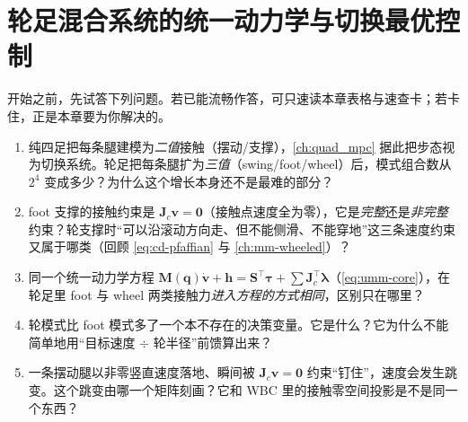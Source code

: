 \chapter{轮足混合系统的统一动力学与切换最优控制}\label{ch:wl-dynamics}


\begin{practice}[前置自测]
开始之前，先试答下列问题。若已能流畅作答，可只速读本章表格与速查卡；若卡住，正是本章要为你解决的。
\begin{enumerate}
  \item 纯四足把每条腿建模为\emph{二值}接触（摆动/支撑），\cref{ch:quad_mpc} 据此把步态视为切换系统。轮足把每条腿扩为\emph{三值}（swing/foot/wheel）后，模式组合数从 $2^4$ 变成多少？为什么这个增长本身还不是最难的部分？
  \item foot 支撑的接触约束是 $\mathbf{J}_c\mathbf{v}=\mathbf{0}$（接触点速度全为零），它是\emph{完整}还是\emph{非完整}约束？轮支撑时“可以沿滚动方向走、但不能侧滑、不能穿地”这三条速度约束又属于哪类（回顾 \cref{eq:cd-pfaffian} 与 \cref{ch:mm-wheeled}）？
  \item 同一个统一动力学方程 $\mathbf{M}(\mathbf{q})\dot{\mathbf{v}}+\mathbf{h}=\mathbf{S}^\top\boldsymbol\tau+\sum\mathbf{J}_c^\top\boldsymbol\lambda$（\cref{eq:umm-core}），在轮足里 foot 与 wheel 两类接触力\emph{进入方程的方式相同}，区别只在哪里？
  \item 轮模式比 foot 模式多了一个本不存在的决策变量。它是什么？它为什么不能简单地用“目标速度 $\div$ 轮半径”前馈算出来？
  \item 一条摆动腿以非零竖直速度落地、瞬间被 $\mathbf{J}_c\mathbf{v}=\mathbf{0}$ 约束“钉住”，速度会发生跳变。这个跳变由哪一个矩阵刻画？它和 WBC 里的接触零空间投影是不是同一个东西？
\end{enumerate}
\end{practice}

